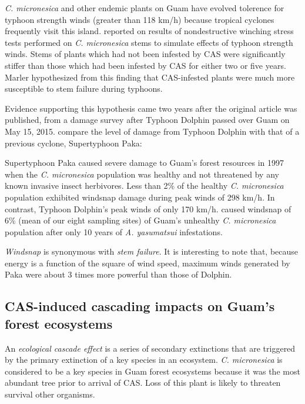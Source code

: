 \documentclass[12pt,letterpaper,english,bibliography=totocnumbered, abstract=on]{scrartcl}
\begin{document}
\textit{C. micronesica} and other endemic plants on Guam have evolved tolerence for typhoon strength winds (greater than 118 km/h) because tropical cyclones frequently visit this island.
\parencite{marlerIncreasedThreatIsland2013} reported on results of nondestructive winching stress tests performed on \textit{C. micronesica} stems to simulate effects of typhoon strength winds. Stems of plants which had not been infested by CAS were significantly stiffer than those which had been infested by CAS for either two or five years. Marler hypothesized from this finding that CAS-infested plants were much more susceptible to stem failure during typhoons.

Evidence supporting this hypothesis came two years after the original article was published, from a damage survey after Typhoon Dolphin passed over Guam on May 15, 2015.
\cite{marler2016topographic} compare the level of damage from Typhoon Dolphin with that of a previous cyclone, Supertyphoon Paka:
\begin{displayquote}
Supertyphoon Paka caused severe damage to
Guam’s forest resources in 1997 when the \textit{C. micronesica} population was
healthy and not threatened by any known invasive insect herbivores.
Less than 2\% of the healthy \textit{C. micronesica} population exhibited
windsnap damage during peak winds of 298 km/h. In contrast,
Typhoon Dolphin’s peak winds of only 170 km/h. caused windsnap
of 6\% (mean of our eight sampling sites) of Guam’s unhealthy \textit{C.
micronesica} population after only 10 years of \textit{A. yasumatsui} infestations.
\end{displayquote}
\textit{Windsnap} is synonymous with \textit{stem failure}. It is interesting to note that, because energy is a function of the square of wind speed, maximum winds generated by Paka were about 3 times more powerful than those of Dolphin.

\subsection{CAS-induced cascading impacts on Guam's forest ecosystems}

An \textit{ecological cascade effect} is a series of secondary extinctions that are triggered by the primary extinction of a key species in an ecosystem. \textit{C. micronesica} is considered to be a key species in Guam forest ecosystems because it was the most abundant tree prior to arrival of CAS. Loss of this plant is likely to threaten survival other organisms.
\end{document}
